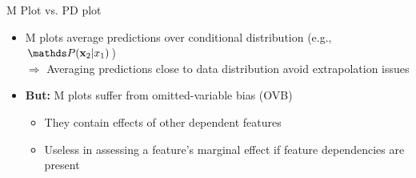 \documentclass[11pt,compress,t,notes=noshow, aspectratio=169, xcolor=table]{beamer}
\begin{document}
\begin{frame}{M Plot vs. PD plot}
\begin{itemize}
    \item M plots average predictions over conditional distribution (e.g., $\P(\xv_2|x_1)$)\\
    $\Rightarrow$ Averaging predictions close to data distribution avoid extrapolation issues
    \item \textbf{But:} M plots suffer from omitted-variable bias (OVB)
\begin{itemize}
\item They contain effects of other dependent features
\item Useless in assessing a feature's marginal effect if feature dependencies are present
\end{itemize}
\end{itemize}


\end{frame}



\end{document}
